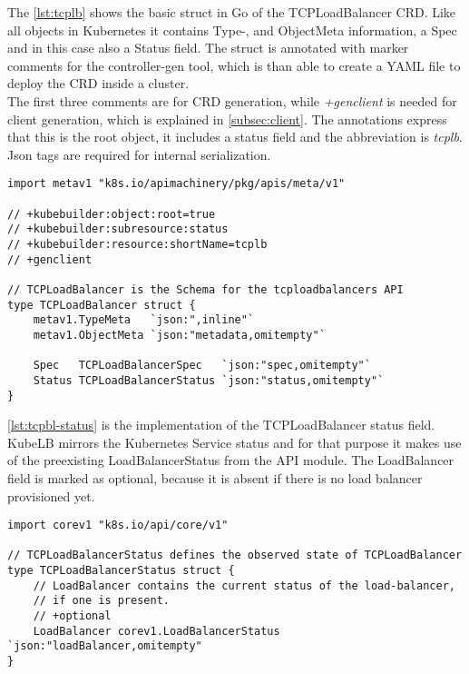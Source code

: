 The \autoref{lst:tcplb} shows the basic struct in Go of the TCPLoadBalancer CRD.
Like all objects in Kubernetes it contains Type-, and ObjectMeta information, a Spec and in this case also a Status field.
The struct is annotated with marker comments for the controller-gen tool, which is than able to create a YAML file to deploy the CRD inside a cluster.
\\
The first three comments are for CRD generation, while \textit{+genclient} is needed for client generation, which is explained in \autoref{subsec:client}.
The annotations express that this is the root object, it includes a status field and the abbreviation is \textit{tcplb}.
Json tags are required for internal serialization.

\begin{lstlisting}[caption={TCPLoadBalancer CRD root struct},label={lst:tcplb}]
import metav1 "k8s.io/apimachinery/pkg/apis/meta/v1"

// +kubebuilder:object:root=true
// +kubebuilder:subresource:status
// +kubebuilder:resource:shortName=tcplb
// +genclient

// TCPLoadBalancer is the Schema for the tcploadbalancers API
type TCPLoadBalancer struct {
	metav1.TypeMeta   `json:",inline"`
	metav1.ObjectMeta `json:"metadata,omitempty"`

	Spec   TCPLoadBalancerSpec   `json:"spec,omitempty"`
	Status TCPLoadBalancerStatus `json:"status,omitempty"`
}
\end{lstlisting}

\newpage

\autoref{lst:tcpbl-status} is the implementation of the TCPLoadBalancer status field.
KubeLB mirrors the Kubernetes Service status and for that purpose it makes use of the preexisting LoadBalancerStatus from the API module.
The LoadBalancer field is marked as optional, because it is absent if there is no load balancer provisioned yet.

\begin{lstlisting}[caption={TCPLoadBalancerStatus struct}, label={lst:tcpbl-status}]
import corev1 "k8s.io/api/core/v1"

// TCPLoadBalancerStatus defines the observed state of TCPLoadBalancer
type TCPLoadBalancerStatus struct {
	// LoadBalancer contains the current status of the load-balancer,
	// if one is present.
	// +optional
	LoadBalancer corev1.LoadBalancerStatus `json:"loadBalancer,omitempty"
}
\end{lstlisting}

